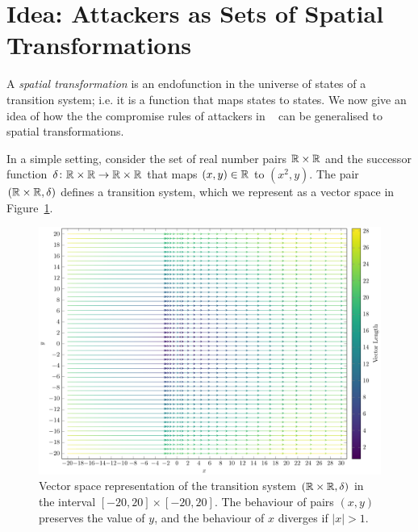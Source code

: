 \section{Idea: Attackers as Sets of Spatial Transformations}
A \emph{spatial transformation} is an endofunction in the universe of states of a transition system; i.e. it is a function that maps states to states. We now give an idea of how the the compromise rules of attackers in ~\cite{KnowYourEnemy} can be generalised to spatial transformations. 

In a simple setting, consider the set of real number pairs $\mathbb{R}\times\mathbb{R}$ and the successor function $\delta\colon \mathbb{R}\times\mathbb{R}\rightarrow \mathbb{R}\times\mathbb{R}$ that maps $(x,y)\in \mathbb{R}$ to $(x^2,y)$. The pair $(\mathbb{R}\times\mathbb{R}, \delta)$ defines a transition system, which we represent as a vector space in Figure~\ref{fig:IntroVectorSpace}.
\begin{figure}[t]
    \centering
    \includegraphics[width=\textwidth]{Figures/VectorSpace1.pdf} 
    \caption{Vector space representation of the transition system $(\mathbb{R}\times\mathbb{R}, \delta)$ in the interval $[-20,20]\times[-20,20]$. The behaviour of pairs $(x,y)$ preserves the value of $y$, and the behaviour of $x$ diverges if $|x|>1$.}
    \label{fig:IntroVectorSpace}
  \end{figure}
